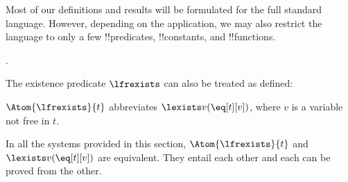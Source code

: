 \documentclass[../../../include/open-logic-section]{subfiles}
\begin{document}
Most of our definitions and results will be formulated for the full
standard language. However, depending on the
application, we may also restrict the language to only a few
!!{predicate}s, !!{constant}s, and !!{function}s.

%
  .

\begin{explain}
The existence predicate $\lfrexists$ can also be treated as 
defined:

\begin{defn}
$\Atom{\lfrexists}{t}$ abbreviates $\lexists v (\eq[t][v])$, 
where $v$ is a variable not free in $t$.
\end{defn}

In all the systems provided in this section, $\Atom{\lfrexists}{t}$
and $\lexists v (\eq[t][v])$ are equivalent. They entail each other 
and each can be proved from the other.
\end{explain}
\end{document}
